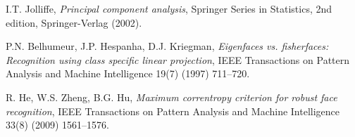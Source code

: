 \documentclass[review]{elsarticle}
\begin{document}
\begin{thebibliography}{99}
I.T. Jolliffe,
\textit{Principal component analysis},
Springer Series in Statistics, 2nd edition, Springer-Verlag (2002).

P.N. Belhumeur, J.P. Hespanha, D.J. Kriegman,
\textit{Eigenfaces vs. fisherfaces: Recognition using class specific linear projection},
IEEE Transactions on Pattern Analysis and Machine Intelligence 19(7) (1997) 711--720.

R. He, W.S. Zheng, B.G. Hu,
\textit{Maximum correntropy criterion for robust face recognition},
IEEE Transactions on Pattern Analysis and Machine Intelligence 33(8) (2009) 1561--1576.

\end{thebibliography}
\end{document}
